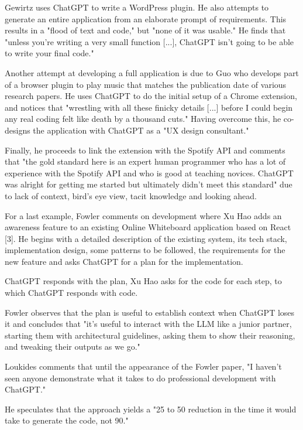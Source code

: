 \documentclass[runningheads]{llncs}
\begin{document}
Gewirtz\cite{Gewirtz2023a} uses ChatGPT to write a WordPress plugin. He also attempts to generate an entire application from an elaborate prompt of requirements. This results in a "flood of text and code," but "none of it was usable." He finds that "unless you're writing a very small function [...], ChatGPT isn't going to be able to write your final code." 

Another attempt at developing a full application is due to Guo\cite{Guo2023} who develops part of a browser plugin to play music that matches the publication date of various research papers. He uses ChatGPT to do the initial setup of a Chrome extension, and notices that "wrestling with all these finicky details [...] before I could begin any real coding felt like death by a thousand cuts." Having overcome this, he co-designs the application with ChatGPT as a "UX design consultant." 

Finally, he proceeds to link the extension with the Spotify API and comments that "the gold standard here is an expert human programmer who has a lot of experience with the Spotify API and who is good at teaching novices. ChatGPT was alright for getting me started but ultimately didn't meet this standard" due to lack of context, bird's eye view, tacit knowledge and looking ahead.

For a last example, Fowler\cite{Fowler2023} comments on development where Xu Hao adds an awareness feature to an existing Online Whiteboard application based on React [3]. He begins with a detailed description of the existing system, its tech stack, implementation design, some patterns to be followed, the requirements for the new feature and asks ChatGPT for a plan for the implementation.

ChatGPT responds with the plan, Xu Hao asks for the code for each step, to which ChatGPT responds with code.

Fowler observes that the plan is useful to establish context when ChatGPT loses it and concludes that "it's useful to interact with the LLM like a junior partner, starting them with architectural guidelines, asking them to show their reasoning, and tweaking their outputs as we go."

Loukides\cite{Loukides2023} comments that until the appearance of the Fowler paper, "I haven't seen anyone demonstrate what it takes to do professional development with ChatGPT."

He speculates that the approach yields a "25 to 50 reduction in the time it would take to generate the code, not 90."
\end{document}
